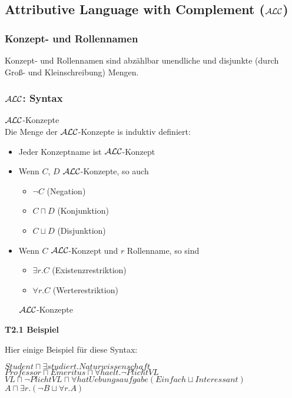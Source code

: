 \subsection{Attributive Language with Complement
(\texorpdfstring{$\mathcal{A}\mathcal{L}\mathcal{C}$}{ALC})}\label{attributive-language-with-complement-alc}

\subsubsection{Konzept- und Rollennamen}\label{konzept--und-rollennamen}

Konzept- und Rollennamen sind abzählbar unendliche und disjunkte (durch Groß- und Kleinschreibung) Mengen.

\subsubsection{\texorpdfstring{$\mathcal{A}\mathcal{L}\mathcal{C}$}{ALC}: Syntax}\label{alcsyntax}

\theoremstyle{definition}
\begin{definition}{$\mathcal{A}\mathcal{L}\mathcal{C}$-Konzepte} \\
  Die Menge der $\mathcal{A}\mathcal{L}\mathcal{C}$-Konzepte is induktiv definiert:
  \begin{itemize}
    \item Jeder Konzeptname ist $\mathcal{A}\mathcal{L}\mathcal{C}$-Konzept
    \item Wenn $C$, $D$ $\mathcal{A}\mathcal{L}\mathcal{C}$-Konzepte, so auch
    \begin{itemize}
      \item $\neg C$ \tabto{2cm}(Negation)
      \item $C \sqcap D$ \tabto{2cm}(Konjunktion)
      \item $C \sqcup D$ \tabto{2cm}(Disjunktion)
    \end{itemize}
    \item {Wenn $C$ $\mathcal{A}\mathcal{L}\mathcal{C}$-Konzept und $r$ Rollenname, so sind
    \begin{itemize}
      \item $\exists r.C$ \tabto{2cm}(Existenzrestriktion)
      \item $\forall r.C$ \tabto{2cm}(Werterestriktion)
    \end{itemize}
    $\mathcal{A}\mathcal{L}\mathcal{C}$-Konzepte}
  \end{itemize}
\end{definition}

\textbf{T2.1 Beispiel}

Hier einige Beispiel für diese Syntax:

\begin{center}
$Student \sqcap \exists studiert.Naturwissenschaft$ \\
$Professor \sqcap Emeritus \sqcap \forall haelt.\neg PlichtVL$ \\
$VL \sqcap \neg PlichtVL \sqcap \forall hatUebungsaufgabe(Einfach \sqcup Interessant)$ \\
$A \sqcap \exists r.(\neg B \sqcup \forall r.A)$
\end{center}

